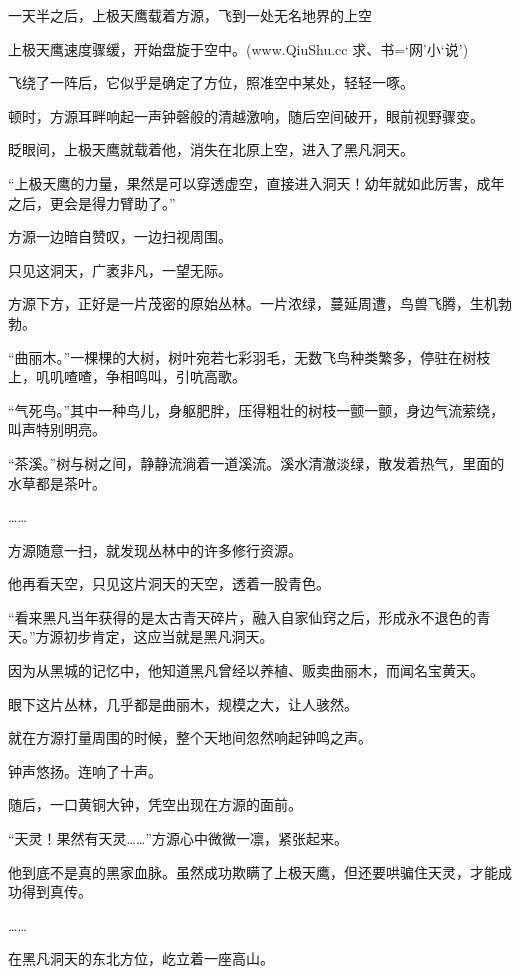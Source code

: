 
\begin{this_body}

一天半之后，上极天鹰载着方源，飞到一处无名地界的上空

上极天鹰速度骤缓，开始盘旋于空中。(www.QiuShu.cc 求、书=‘网’小‘说’)

飞绕了一阵后，它似乎是确定了方位，照准空中某处，轻轻一啄。

顿时，方源耳畔响起一声钟磬般的清越激响，随后空间破开，眼前视野骤变。

眨眼间，上极天鹰就载着他，消失在北原上空，进入了黑凡洞天。

“上极天鹰的力量，果然是可以穿透虚空，直接进入洞天！幼年就如此厉害，成年之后，更会是得力臂助了。”

方源一边暗自赞叹，一边扫视周围。

只见这洞天，广袤非凡，一望无际。

方源下方，正好是一片茂密的原始丛林。一片浓绿，蔓延周遭，鸟兽飞腾，生机勃勃。

“曲丽木。”一棵棵的大树，树叶宛若七彩羽毛，无数飞鸟种类繁多，停驻在树枝上，叽叽喳喳，争相鸣叫，引吭高歌。

“气死鸟。”其中一种鸟儿，身躯肥胖，压得粗壮的树枝一颤一颤，身边气流萦绕，叫声特别明亮。

“茶溪。”树与树之间，静静流淌着一道溪流。溪水清澈淡绿，散发着热气，里面的水草都是茶叶。

……

方源随意一扫，就发现丛林中的许多修行资源。

他再看天空，只见这片洞天的天空，透着一股青色。

“看来黑凡当年获得的是太古青天碎片，融入自家仙窍之后，形成永不退色的青天。”方源初步肯定，这应当就是黑凡洞天。

因为从黑城的记忆中，他知道黑凡曾经以养植、贩卖曲丽木，而闻名宝黄天。

眼下这片丛林，几乎都是曲丽木，规模之大，让人骇然。

就在方源打量周围的时候，整个天地间忽然响起钟鸣之声。

钟声悠扬。连响了十声。

随后，一口黄铜大钟，凭空出现在方源的面前。

“天灵！果然有天灵……”方源心中微微一凛，紧张起来。

他到底不是真的黑家血脉。虽然成功欺瞒了上极天鹰，但还要哄骗住天灵，才能成功得到真传。

……

在黑凡洞天的东北方位，屹立着一座高山。


\end{this_body}
